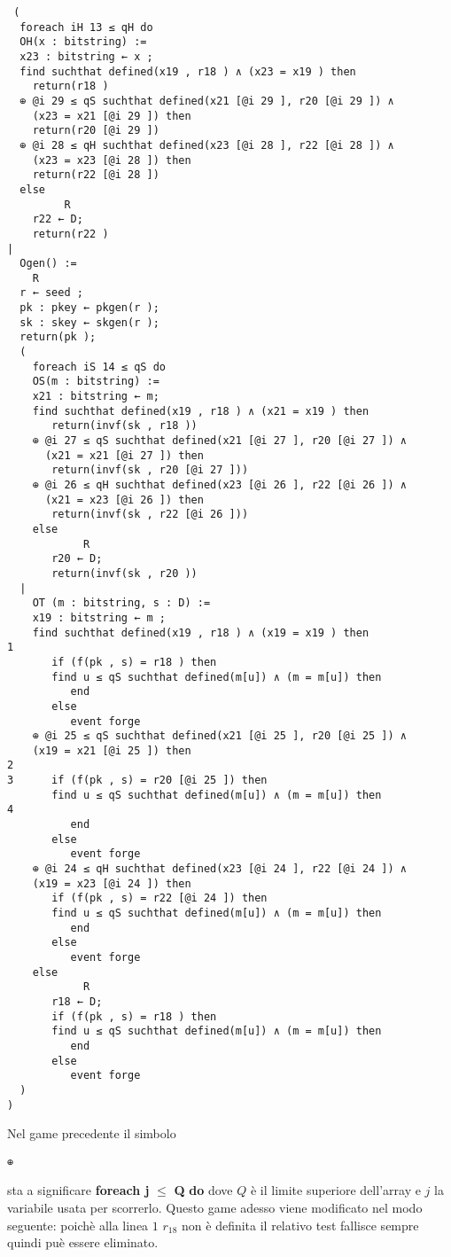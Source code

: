 \documentclass[a4paper,openright,twoside,12pt]{report}
\newcommand{\foreach}[2]{\textbf{foreach #1} $\leq$ \textbf{#2} \textbf{do}}
\begin{document}
\begin{verbatim}
 (
  foreach iH 13 ≤ qH do
  OH(x : bitstring) :=
  x23 : bitstring ← x ;
  find suchthat defined(x19 , r18 ) ∧ (x23 = x19 ) then
    return(r18 )
  ⊕ @i 29 ≤ qS suchthat defined(x21 [@i 29 ], r20 [@i 29 ]) ∧ 
    (x23 = x21 [@i 29 ]) then
    return(r20 [@i 29 ])
  ⊕ @i 28 ≤ qH suchthat defined(x23 [@i 28 ], r22 [@i 28 ]) ∧ 
    (x23 = x23 [@i 28 ]) then
    return(r22 [@i 28 ])
  else
         R
    r22 ← D;
    return(r22 )
|
  Ogen() :=
    R
  r ← seed ;
  pk : pkey ← pkgen(r );
  sk : skey ← skgen(r );
  return(pk );
  (
    foreach iS 14 ≤ qS do
    OS(m : bitstring) :=
    x21 : bitstring ← m;
    find suchthat defined(x19 , r18 ) ∧ (x21 = x19 ) then
       return(invf(sk , r18 ))
    ⊕ @i 27 ≤ qS suchthat defined(x21 [@i 27 ], r20 [@i 27 ]) ∧ 
      (x21 = x21 [@i 27 ]) then
       return(invf(sk , r20 [@i 27 ]))
    ⊕ @i 26 ≤ qH suchthat defined(x23 [@i 26 ], r22 [@i 26 ]) ∧ 
      (x21 = x23 [@i 26 ]) then
       return(invf(sk , r22 [@i 26 ]))
    else
            R
       r20 ← D;
       return(invf(sk , r20 ))
  |
    OT (m : bitstring, s : D) :=
    x19 : bitstring ← m ;
    find suchthat defined(x19 , r18 ) ∧ (x19 = x19 ) then
1
       if (f(pk , s) = r18 ) then
       find u ≤ qS suchthat defined(m[u]) ∧ (m = m[u]) then
          end
       else
          event forge
    ⊕ @i 25 ≤ qS suchthat defined(x21 [@i 25 ], r20 [@i 25 ]) ∧ 
	(x19 = x21 [@i 25 ]) then
2
3      if (f(pk , s) = r20 [@i 25 ]) then
       find u ≤ qS suchthat defined(m[u]) ∧ (m = m[u]) then
4
          end
       else
          event forge
    ⊕ @i 24 ≤ qH suchthat defined(x23 [@i 24 ], r22 [@i 24 ]) ∧ 
	(x19 = x23 [@i 24 ]) then
       if (f(pk , s) = r22 [@i 24 ]) then
       find u ≤ qS suchthat defined(m[u]) ∧ (m = m[u]) then
          end
       else
          event forge
    else
            R
       r18 ← D;
       if (f(pk , s) = r18 ) then
       find u ≤ qS suchthat defined(m[u]) ∧ (m = m[u]) then
          end
       else
          event forge
  )
)
\end{verbatim}
Nel game precedente il simbolo \begin{verbatim}⊕\end{verbatim}
sta a significare \foreach{j}{Q} dove $Q$ \`e il limite superiore dell'array e $j$ la variabile
usata per scorrerlo. 
Questo game adesso viene modificato nel modo seguente: poich\`e alla linea $1$ $r_{18}$ non \`e definita il relativo test fallisce sempre quindi
pu\`e essere eliminato.
\end{document}
